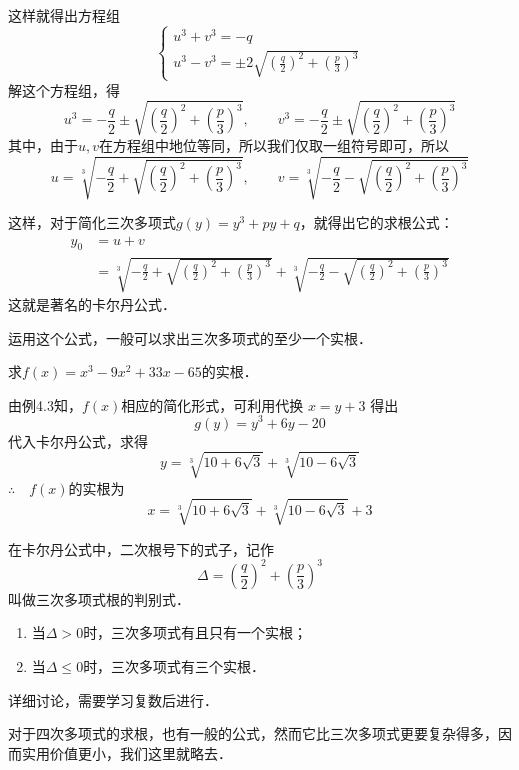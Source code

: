 这样就得出方程组
\[\begin{cases}
    u^3+v^3=-q\\
    u^3-v^3=\pm 2\sqrt{\left(\frac{q}{2}\right)^2+\left(\frac{p}{3}\right)^3}
\end{cases}\]
解这个方程组，得
\[u^3=-\frac{q}{2}\pm \sqrt{\left(\frac{q}{2}\right)^2+\left(\frac{p}{3}\right)^3},\qquad v^3=-\frac{q}{2}\pm \sqrt{\left(\frac{q}{2}\right)^2+\left(\frac{p}{3}\right)^3}\]
其中，由于$u,v$在方程组中地位等同，所以我们仅取一组符号即可，所以
\[u=\sqrt[3]{-\frac{q}{2}+ \sqrt{\left(\frac{q}{2}\right)^2+\left(\frac{p}{3}\right)^3}},\qquad v=\sqrt[3]{-\frac{q}{2}- \sqrt{\left(\frac{q}{2}\right)^2+\left(\frac{p}{3}\right)^3}}\]

这样，对于简化三次多项式$g(y)=y^3+py+q$，就得出它的求根公式：
\[\begin{split}
    y_0&=u+v\\
    &=\sqrt[3]{-\frac{q}{2}+ \sqrt{\left(\frac{q}{2}\right)^2+\left(\frac{p}{3}\right)^3}}+\sqrt[3]{-\frac{q}{2}- \sqrt{\left(\frac{q}{2}\right)^2+\left(\frac{p}{3}\right)^3}}
\end{split}\]
这就是著名的卡尔丹公式．

运用这个公式，一般可以求出三次多项式的至少一个实根．


\begin{example}
    求$f(x)=x^3-9x^2+33x-65$的实根．
\end{example}

\begin{solution}
    由例4.3知，$f(x)$相应的简化形式，可利用代换
$x=y+3$ 得出
\[g(y)=y^3+6y-20\]
代入卡尔丹公式，求得
\[y=\sqrt[3]{10+6\sqrt{3}}+\sqrt[3]{10-6\sqrt{3}}\]
$\therefore\quad f(x)$的实根为
\[x=\sqrt[3]{10+6\sqrt{3}}+\sqrt[3]{10-6\sqrt{3}}+3\]
\end{solution}

\begin{rmk}
在卡尔丹公式中，二次根号下的式子，记作
\[\Delta=\left(\frac{q}{2}\right)^2+\left(\frac{p}{3}\right)^3\]
叫做三次多项式根的判别式．
\begin{enumerate}
    \item 当$\Delta>0$时，三次多项式有且只有一个实根；
    \item 当$\Delta\le 0$时，三次多项式有三个实根．
\end{enumerate}
详细讨论，需要学习复数后进行．
\end{rmk}

对于四次多项式的求根，也有一般的公式，然而它比三次多项式更要复杂得多，因而实用价值更小，我们这里就略去．

